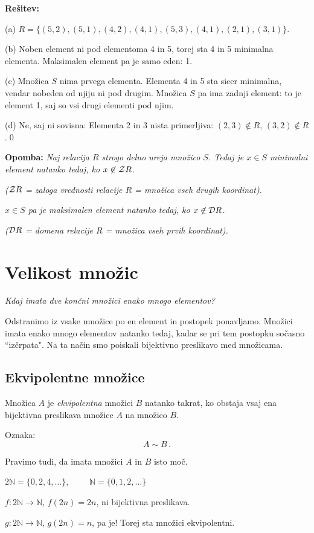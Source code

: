 \documentclass[11pt,paper=b5,DIV=13,headinclude,footinclude]{scrbook}
\newcounter{example}
\begin{document}
\textbf{Rešitev:}

(a) $R = \{(5,2),(5,1),(4,2),(4,1),(5,3),(4,1),(2,1),(3,1)\}$.

(b) Noben element ni pod elementoma 4 in 5, torej sta 4 in 5 minimalna elementa.
Maksimalen element pa je samo eden: 1.

(c) Množica $S$ nima prvega elementa. Elementa 4 in 5 sta sicer minimalna, vendar nobeden
od njiju ni pod drugim. Množica $S$ pa ima zadnji element: to je element 1, saj so vsi drugi elementi
pod njim.

(d) Ne, saj ni sovisna: Elementa 2 in 3 nista primerljiva: $(2,3)\not\in R$, $(3,2)\not\in R$.\qed

\bigskip
\textbf{Opomba:} \emph{Naj relacija $R$ strogo delno ureja množico $S$.
Tedaj je $x\in S$ minimalni element natanko tedaj, ko $x\not\in {\cal Z}R$.}

\emph{(${\cal Z}R$ = zaloga vrednosti relacije $R$ = množica vseh drugih koordinat).}

\emph{$x\in S$ pa je maksimalen element natanko tedaj, ko $x\not\in {\cal D}R$.}

\emph{(${\cal D}R$ = domena relacije $R$ = množica vseh prvih koordinat).}


\chapter{Velikost množic}
{\em Kdaj imata dve končni množici enako mnogo elementov?

Odstranimo iz vsake množice po en element in postopek ponavljamo. Množici
imata enako mnogo elementov natanko tedaj, kadar se pri tem postopku sočasno ``izčrpata".
Na ta način smo poiskali bijektivno preslikavo med množicama.}
\section{Ekvipolentne množice}

Množica $A$ je {\em ekvipolentna} množici $B$ natanko takrat, ko obstaja vsaj ena bijektivna preslikava
množice $A$ na množico $B$.

Oznaka: $$A\sim B\,.$$

Pravimo tudi, da imata množici $A$ in $B$ isto moč.

\bigskip

\begin{example*}

$2\mathbb{N} = \{0,2,4,\ldots\}$,~~~~~$\mathbb{N} = \{0,1,2,\ldots\}$

$f: 2\mathbb{N} \to \mathbb{N}$, $f(2n) = 2n$, ni bijektivna preslikava.

$g: 2\mathbb{N} \to \mathbb{N}$, $g(2n) = n$, pa je! Torej sta množici ekvipolentni.\end{example*}
\end{document}
